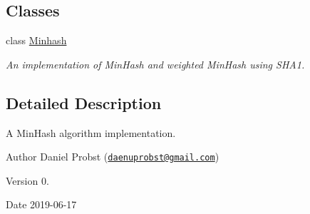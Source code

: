\subsection*{Classes}
\begin{DoxyCompactItemize}
\item 
class \hyperlink{classMinhash}{Minhash}
\begin{DoxyCompactList}\small\item\em An implementation of Min\+Hash and weighted Min\+Hash using S\+H\+A1. \end{DoxyCompactList}\end{DoxyCompactItemize}


\subsection{Detailed Description}
A Min\+Hash algorithm implementation. 

\begin{DoxyAuthor}{Author}
Daniel Probst (\href{mailto:daenuprobst@gmail.com}{\tt daenuprobst@gmail.\+com}) 
\end{DoxyAuthor}
\begin{DoxyVersion}{Version}
0. 
\end{DoxyVersion}
\begin{DoxyDate}{Date}
2019-\/06-\/17 
\end{DoxyDate}

